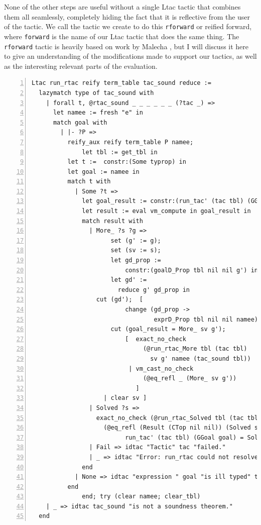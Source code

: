\documentclass{puthesis}
\begin{document}
None of the other steps are useful without a single Ltac tactic that
combines them all seamlessly, completely hiding the fact that it is
reflective from the user of the tactic. We call the tactic we create
to do this \lstinline|rforward| or reified forward, where
\lstinline|forward| is the name of our Ltac tactic that does the same
thing. The \lstinline|rforward| tactic is heavily based on work by
Malecha \cite[chapter 6]{malecha:thesis}, but I will discuss it here
to give an understanding of the modifications made to support our
tactics, as well as the interesting relevant parts of the evaluation.
\pagebreak
\begin{singlespace}
\begin{lstlisting}[numbers=left]
Ltac run_rtac reify term_table tac_sound reduce :=
  lazymatch type of tac_sound with
    | forall t, @rtac_sound _ _ _ _ _ _ (?tac _) =>
	  let namee := fresh "e" in
	  match goal with
	    | |- ?P => 
	      reify_aux reify term_table P namee;
              let tbl := get_tbl in
	      let t :=  constr:(Some typrop) in
	      let goal := namee in
	      match t with
	        | Some ?t =>
	          let goal_result := constr:(run_tac' (tac tbl) (GGoal namee)) in
	          let result := eval vm_compute in goal_result in
	          match result with
	            | More_ ?s ?g =>
                      set (g' := g);
                      set (sv := s);
                      let gd_prop := 
                          constr:(goalD_Prop tbl nil nil g') in
                      let gd' := 
                        reduce g' gd_prop in
	              cut (gd');  [ 
                          change (gd_prop -> 
                                  exprD_Prop tbl nil nil namee);
	                  cut (goal_result = More_ sv g');
                          [  exact_no_check
                               (@run_rtac_More tbl (tac tbl) 
                                 sv g' namee (tac_sound tbl))
                           | vm_cast_no_check 
                               (@eq_refl _ (More_ sv g'))
                             ] 
	                | clear sv ]
	            | Solved ?s =>
	              exact_no_check (@run_rtac_Solved tbl (tac tbl) s namee (tac_sound tbl) 
	                (@eq_refl (Result (CTop nil nil)) (Solved s) <:
                          run_tac' (tac tbl) (GGoal goal) = Solved s))
	            | Fail => idtac "Tactic" tac "failed."
	            | _ => idtac "Error: run_rtac could not resolve the result from the tactic :" tac
	          end
	        | None => idtac "expression " goal "is ill typed" t
	      end
              end; try (clear namee; clear_tbl)
	| _ => idtac tac_sound "is not a soundness theorem."
  end
\end{lstlisting}
\end{singlespace}
\end{document}
